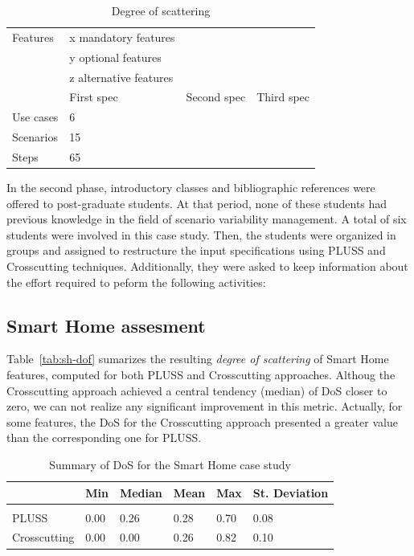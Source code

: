 \documentclass{acm_proc_article-sp}
\begin{document}
\begin{table}[htb]
\centering
\caption{Degree of scattering}
\label{tab:sh-dos}
\begin{small}
\begin{tabular}{llll} \hline
	Features	& x mandatory features 		&  	&\\
			    & y optional features  		&  	&\\
			    & z alternative features 	&	& \\ \hline
			    & First spec & Second spec 	& Third spec  	\\
 	Use cases	& 6			 &				&				\\
	Scenarios   & 15		 &				&				\\
	Steps		& 65		 &				&	 		    \\ \hline
\end{tabular}
\end{small}
\end{table}

In the second phase, introductory classes and bibliographic references were
offered to post-graduate students. At that period, none of these students had
previous knowledge in the field of scenario variability management. A total of six
students were involved in this case study. Then, the students were organized in
groups and assigned to restructure the input specifications using PLUSS and
Crosscutting techniques. Additionally, they were asked to keep information about
the effort required to peform the following activities:

\subsection{Smart Home assesment}

Table~\ref{tab:sh-dof} sumarizes the resulting \emph{degree of scattering} of
Smart Home features, computed for both PLUSS and Crosscutting approaches. Althoug the
Crosscutting approach achieved a central tendency (median) of DoS closer to
zero, we can not realize any significant improvement in this metric. Actually, for some
features, the DoS for the Crosscutting approach presented a greater value than
the corresponding one for PLUSS. 

\begin{table}[htb]
\centering
\caption{Summary of DoS for the Smart Home case study}
\label{tab:sh-dos}
\begin{small}
\begin{tabular}{llllll} \hline
					& Min 	& Median 	& Mean 	& Max 	& St. Deviation \\ \hline \\
	PLUSS			& 0.00  & 0.26   	& 0.28  & 0.70 	& 0.08 			\\
	Crosscutting	& 0.00  & 0.00  	& 0.26 	& 0.82 & 0.10  		\\ \hline	
\end{tabular}
\end{small}
\end{table}
\end{document}
